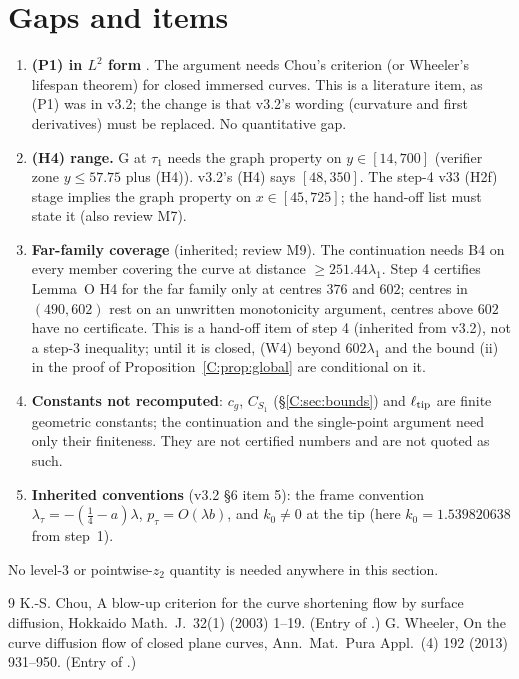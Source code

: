 \documentclass[11pt]{article}
\begin{document}
\section{Gaps and items}\label{C:sec:gaps}
\begin{enumerate}[leftmargin=*]
\item \textbf{(P1) in $L^2$ form} \tH. The argument needs Chou's criterion (or Wheeler's lifespan theorem) for closed immersed curves. This is a literature item, as (P1) was in v3.2; the change is that v3.2's wording (curvature and first derivatives) must be replaced. No quantitative gap.
\item \textbf{(H4) range.} G at $\tau_1$ needs the graph property on $y\in[14,700]$ (verifier zone $y\le57.75$ plus (H4)). v3.2's (H4) says $[48,350]$. The step-4 v33 (H2f) stage implies the graph property on $x\in[45,725]$; the hand-off list must state it (also review M7).
\item \textbf{Far-family coverage} (inherited; review M9). The continuation needs B4 on every member covering the curve at distance $\ge251.44\lambda_1$. Step 4 certifies Lemma~O H4 for the far family only at centres $376$ and $602$; centres in $(490,602)$ rest on an unwritten monotonicity argument, centres above $602$ have no certificate. This is a hand-off item of step 4 (inherited from v3.2), not a step-3 inequality; until it is closed, (W4) beyond $602\lambda_1$ and the bound (ii) in the proof of Proposition~\ref{C:prop:global} are conditional on it.
\item \textbf{Constants not recomputed}: $c_g$, $C_{S_1}$ (\S\ref{C:sec:bounds}) and $\ell_{\rm tip}$ are finite geometric constants; the continuation and the single-point argument need only their finiteness. They are not certified numbers and are not quoted as such.
\item \textbf{Inherited conventions} (v3.2 \S6 item 5): the frame convention $\lambda_\tau=-(\frac14-a)\lambda$, $p_\tau=O(\lambda b)$, and $k_0\ne0$ at the tip (here $k_0=1.539820638$ from step~1).
\end{enumerate}
No level-3 or pointwise-$z_2$ quantity is needed anywhere in this section.

\ifdefined\stepmain\else
\begin{thebibliography}{9}
 K.-S. Chou, A blow-up criterion for the curve shortening flow by surface diffusion, Hokkaido Math.\ J.\ 32(1) (2003) 1--19. (Entry  of .)
 G. Wheeler, On the curve diffusion flow of closed plane curves, Ann.\ Mat.\ Pura Appl.\ (4) 192 (2013) 931--950. (Entry  of .)
\end{thebibliography}
\end{document}
